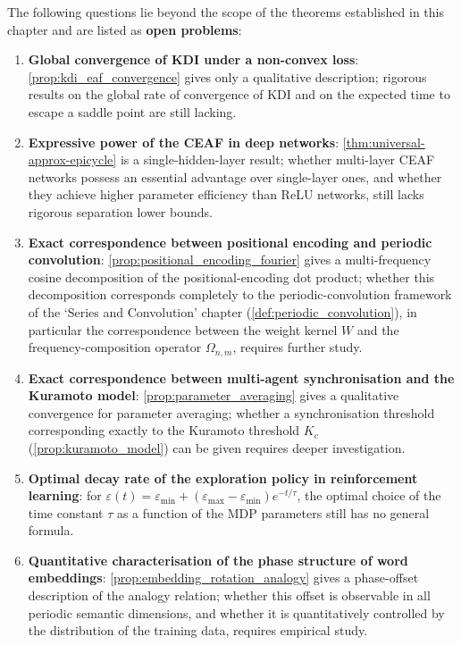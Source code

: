 \begin{remark}\label{rem:agent_open_problems}
The following questions lie beyond the scope of the theorems established in this chapter and are listed as \textbf{open problems}:
\begin{enumerate}[label=(\roman*)]
    \item \textbf{Global convergence of KDI under a non-convex loss}: \cref{prop:kdi_eaf_convergence} gives only a qualitative description; rigorous results on the global rate of convergence of KDI and on the expected time to escape a saddle point are still lacking.
    \item \textbf{Expressive power of the CEAF in deep networks}: \cref{thm:universal-approx-epicycle} is a single-hidden-layer result; whether multi-layer CEAF networks possess an essential advantage over single-layer ones, and whether they achieve higher parameter efficiency than ReLU networks, still lacks rigorous separation lower bounds.
    \item \textbf{Exact correspondence between positional encoding and periodic convolution}: \cref{prop:positional_encoding_fourier} gives a multi-frequency cosine decomposition of the positional-encoding dot product; whether this decomposition corresponds completely to the periodic-convolution framework of the `Series and Convolution' chapter (\cref{def:periodic_convolution}), in particular the correspondence between the weight kernel $W$ and the frequency-composition operator $\Omega_{n,m}$, requires further study.
    \item \textbf{Exact correspondence between multi-agent synchronisation and the Kuramoto model}: \cref{prop:parameter_averaging} gives a qualitative convergence for parameter averaging; whether a synchronisation threshold corresponding exactly to the Kuramoto threshold $K_c$ (\cref{prop:kuramoto_model}) can be given requires deeper investigation.
    \item \textbf{Optimal decay rate of the exploration policy in reinforcement learning}: for $\varepsilon(t) = \varepsilon_{\min} + (\varepsilon_{\max} - \varepsilon_{\min}) e^{-t/\tau}$, the optimal choice of the time constant $\tau$ as a function of the MDP parameters still has no general formula.
    \item \textbf{Quantitative characterisation of the phase structure of word embeddings}: \cref{prop:embedding_rotation_analogy} gives a phase-offset description of the analogy relation; whether this offset is observable in all periodic semantic dimensions, and whether it is quantitatively controlled by the distribution of the training data, requires empirical study.

\end{enumerate}
\end{remark}

